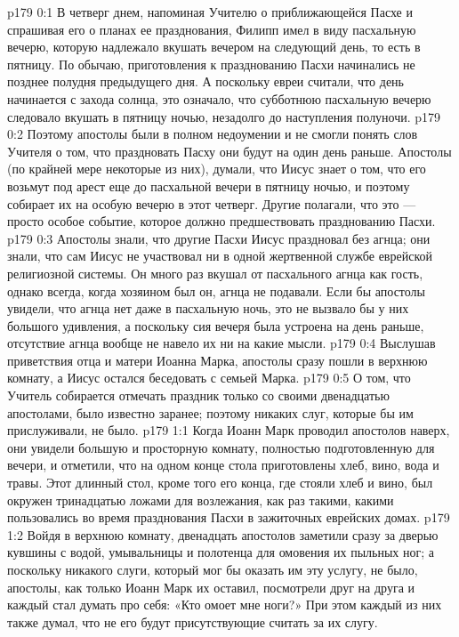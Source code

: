 \author{Комиссия срединников}
\vs p179 0:1 В четверг днем, напоминая Учителю о приближающейся Пасхе и спрашивая его о планах ее празднования, Филипп имел в виду пасхальную вечерю, которую надлежало вкушать вечером на следующий день, то есть в пятницу. По обычаю, приготовления к празднованию Пасхи начинались не позднее полудня предыдущего дня. А поскольку евреи считали, что день начинается с захода солнца, это означало, что субботнюю пасхальную вечерю следовало вкушать в пятницу ночью, незадолго до наступления полуночи.
\vs p179 0:2 Поэтому апостолы были в полном недоумении и не смогли понять слов Учителя о том, что праздновать Пасху они будут на один день раньше. Апостолы (по крайней мере некоторые из них), думали, что Иисус знает о том, что его возьмут под арест еще до пасхальной вечери в пятницу ночью, и поэтому собирает их на особую вечерю в этот четверг. Другие полагали, что это --- просто особое событие, которое должно предшествовать празднованию Пасхи.
\vs p179 0:3 Апостолы знали, что другие Пасхи Иисус праздновал без агнца; они знали, что сам Иисус не участвовал ни в одной жертвенной службе еврейской религиозной системы. Он много раз вкушал от пасхального агнца как гость, однако всегда, когда хозяином был он, агнца не подавали. Если бы апостолы увидели, что агнца нет даже в пасхальную ночь, это не вызвало бы у них большого удивления, а поскольку сия вечеря была устроена на день раньше, отсутствие агнца вообще не навело их ни на какие мысли.
\vs p179 0:4 Выслушав приветствия отца и матери Иоанна Марка, апостолы сразу пошли в верхнюю комнату, а Иисус остался беседовать с семьей Марка.
\vs p179 0:5 О том, что Учитель собирается отмечать праздник только со своими двенадцатью апостолами, было известно заранее; поэтому никаких слуг, которые бы им прислуживали, не было.
\vs p179 1:1 Когда Иоанн Марк проводил апостолов наверх, они увидели большую и просторную комнату, полностью подготовленную для вечери, и отметили, что на одном конце стола приготовлены хлеб, вино, вода и травы. Этот длинный стол, кроме того его конца, где стояли хлеб и вино, был окружен тринадцатью ложами для возлежания, как раз такими, какими пользовались во время празднования Пасхи в зажиточных еврейских домах.
\vs p179 1:2 Войдя в верхнюю комнату, двенадцать апостолов заметили сразу за дверью кувшины с водой, умывальницы и полотенца для омовения их пыльных ног; а поскольку никакого слуги, который мог бы оказать им эту услугу, не было, апостолы, как только Иоанн Марк их оставил, посмотрели друг на друга и каждый стал думать про себя: «Кто омоет мне ноги?» При этом каждый из них также думал, что не его будут присутствующие считать за их слугу.
